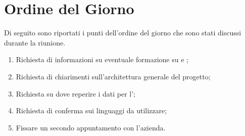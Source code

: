 \documentclass{article}
\begin{document}
\section{Ordine del Giorno}%
\label{ordine_del_giorno}
Di seguito sono riportati i punti dell'ordine del giorno che sono stati discussi durante la riunione.
\begin{enumerate}
  \item Richiesta di informazioni su eventuale formazione su  e ;
  \item Richiesta di chiarimenti sull'architettura generale del progetto;
  \item Richiesta su dove reperire i dati per l';
  \item Richiesta di conferma sui linguaggi da utilizzare;
  \item Fissare un secondo appuntamento con l'azienda.
\end{enumerate}
\end{document}
